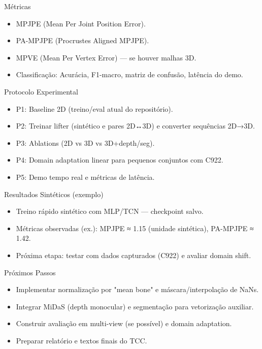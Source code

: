 \documentclass{beamer}
\begin{document}
\begin{frame}{Métricas}
  \begin{itemize}
    \item MPJPE (Mean Per Joint Position Error).
    \item PA-MPJPE (Procrustes Aligned MPJPE).
    \item MPVE (Mean Per Vertex Error) — se houver malhas 3D.
    \item Classificação: Acurácia, F1-macro, matriz de confusão, latência do demo.
  \end{itemize}
\end{frame}

\begin{frame}{Protocolo Experimental}
  \begin{itemize}
    \item P1: Baseline 2D (treino/eval atual do repositório).
    \item P2: Treinar lifter (sintético e pares 2D↔3D) e converter sequências 2D→3D.
    \item P3: Ablations (2D vs 3D vs 3D+depth/seg).
    \item P4: Domain adaptation linear para pequenos conjuntos com C922.
    \item P5: Demo tempo real e métricas de latência.
  \end{itemize}
\end{frame}

\begin{frame}{Resultados Sintéticos (exemplo)}
  \begin{itemize}
    \item Treino rápido sintético com MLP/TCN — checkpoint salvo.
    \item Métricas observadas (ex.): MPJPE ≈ 1.15 (unidade sintética), PA-MPJPE ≈ 1.42.
    \item Próxima etapa: testar com dados capturados (C922) e avaliar domain shift.
  \end{itemize}
\end{frame}

\begin{frame}{Próximos Passos}
  \begin{itemize}
    \item Implementar normalização por "mean bone" e máscara/interpolação de NaNs.
    \item Integrar MiDaS (depth monocular) e segmentação para vetorização auxiliar.
    \item Construir avaliação em multi-view (se possível) e domain adaptation.
    \item Preparar relatório e textos finais do TCC.
  \end{itemize}
\end{frame}
\end{document}
